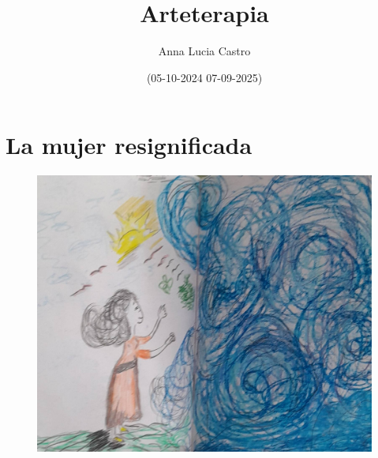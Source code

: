 \documentclass[12pt, a4paper, twoside]{book} %
\author{Anna Lucia Castro}
\title{\textbf{Arteterapia}}
\date{(05-10-2024 07-09-2025)}
\begin{document}
\maketitle
\thispagestyle{empty} %

\tableofcontents

\chapter{La mujer resignificada}

\begin{figure}[H]
	\centering
	\includegraphics[width=\textwidth]{./images/1f81324df3940b.jpg}
\end{figure}

\clearpage
\end{document}
